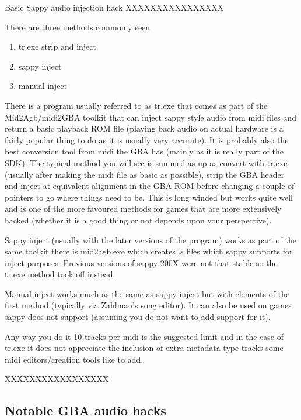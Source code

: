 \documentclass[
]{book}
\providecommand{\tightlist}{%
  \setlength{\itemsep}{0pt}\setlength{\parskip}{0pt}}
\begin{document}
Basic Sappy audio injection hack XXXXXXXXXXXXXXXX

There are three methods commonly seen

\begin{enumerate}
\def\labelenumi{\arabic{enumi}.}
\tightlist
\item
  tr.exe strip and inject
\item
  sappy inject
\item
  manual inject
\end{enumerate}

There is a program usually referred to as tr.exe that comes as part of the Mid2Agb/midi2GBA toolkit that can inject sappy style audio from midi files and return a basic playback ROM file (playing back audio on actual hardware is a fairly popular thing to do as it is usually very accurate). It is probably also the best conversion tool from midi the GBA has (mainly as it is really part of the SDK). The typical method you will see is summed as up as convert with tr.exe (usually after making the midi file as basic as possible), strip the GBA header and inject at equivalent alignment in the GBA ROM before changing a couple of pointers to go where things need to be. This is long winded but works quite well and is one of the more favoured methods for games that are more extensively hacked (whether it is a good thing or not depends upon your perspective).

Sappy inject (usually with the later versions of the program) works as part of the same toolkit there is mid2agb.exe which creates .s files which sappy supports for inject purposes. Previous versions of sappy 200X were not that stable so the tr.exe method took off instead.

Manual inject works much as the same as sappy inject but with elements of the first method (typically via Zahlman's song editor). It can also be used on games sappy does not support (assuming you do not want to add support for it).

Any way you do it 10 tracks per midi is the suggested limit and in the case of tr.exe it does not appreciate the inclusion of extra metadata type tracks some midi editors/creation tools like to add.

XXXXXXXXXXXXXXXXX

\hypertarget{notable-gba-audio-hacks}{%
\subsection{Notable GBA audio hacks}\label{notable-gba-audio-hacks}}
\end{document}

